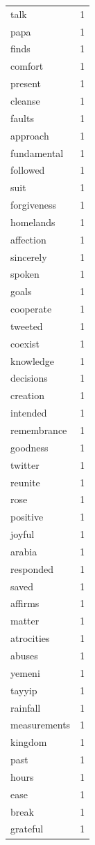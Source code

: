 \begin{tabular}{lr}
talk & 1 \\
papa & 1 \\
finds & 1 \\
comfort & 1 \\
present & 1 \\
cleanse & 1 \\
faults & 1 \\
approach & 1 \\
fundamental & 1 \\
followed & 1 \\
suit & 1 \\
forgiveness & 1 \\
homelands & 1 \\
affection & 1 \\
sincerely & 1 \\
spoken & 1 \\
goals & 1 \\
cooperate & 1 \\
tweeted & 1 \\
coexist & 1 \\
knowledge & 1 \\
decisions & 1 \\
creation & 1 \\
intended & 1 \\
remembrance & 1 \\
goodness & 1 \\
twitter & 1 \\
reunite & 1 \\
rose & 1 \\
positive & 1 \\
joyful & 1 \\
arabia & 1 \\
responded & 1 \\
saved & 1 \\
affirms & 1 \\
matter & 1 \\
atrocities & 1 \\
abuses & 1 \\
yemeni & 1 \\
tayyip & 1 \\
rainfall & 1 \\
measurements & 1 \\
kingdom & 1 \\
past & 1 \\
hours & 1 \\
ease & 1 \\
break & 1 \\
grateful & 1 \\

\end{tabular}
